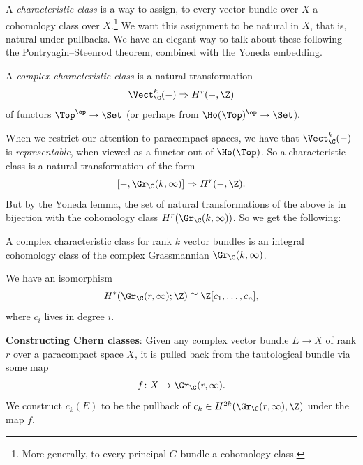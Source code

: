 \documentclass[11pt]{amsart}
\begin{document}
A \emph{characteristic class} is a way to assign, to every vector bundle over $X$ a cohomology class over $X$.\footnote{More generally, to every principal $G$-bundle a cohomology class.} We want this assignment to be natural in $X$, that is, natural under pullbacks. We have an elegant way to talk about these following the Pontryagin--Steenrod theorem, combined with the Yoneda embedding. 

\begin{definition}\label{def:complex-characteristic-class} A \emph{complex characteristic class} is a natural transformation
\begin{align*}
    \Vect_\C^k(-) \Rightarrow H^r(-,\Z)
\end{align*}
of functors $\Top^\op \to \Set$ (or perhaps from $\Ho(\Top)^\op \to \Set$).
\end{definition}

When we restrict our attention to paracompact spaces, we have that $\Vect_\C^k(-)$ is \emph{representable}, when viewed as a functor out of $\Ho(\Top)$. So a characteristic class is a natural transformation of the form
\begin{align*}
    \left[ -,\Gr_\C(k,\infty) \right] \Rightarrow H^r(-,\Z).
\end{align*}
%
But by the Yoneda lemma, the set of natural transformations of the above is in bijection with the cohomology class $H^r(\Gr_\C(k,\infty))$. So we get the following:

\begin{slogan} A complex characteristic class for rank $k$ vector bundles is an integral cohomology class of the complex Grassmannian $\Gr_\C(k,\infty)$.
\end{slogan}

\begin{theorem}[Borel]
We have an isomorphism
\begin{align*}
    H^\ast(\Gr_\C(r,\infty);\Z) \cong \Z[c_1, \ldots, c_n],
\end{align*}
where $c_i$ lives in degree $i$.
\end{theorem}

\textbf{Constructing Chern classes}: Given any complex vector bundle $E\to X$ of rank $r$ over a paracompact space $X$, it is pulled back from the tautological bundle via some map
\begin{align*}
    f \colon X \to \Gr_\C(r,\infty).
\end{align*}
We construct $c_k(E)$ to be the pullback of $c_k \in H^{2k}(\Gr_\C(r,\infty),\Z)$ under the map $f$.
\end{document}
